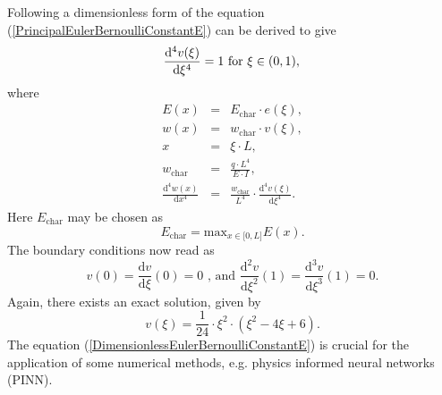 \documentclass[a4paper,11pt]{article}
\begin{document}
Following \cite[pp. 3]{hoffmann2014modellierung} a dimensionless form of the equation (\ref{PrincipalEulerBernoulliConstantE}) can be derived to give
\begin{equation} \label{DimensionlessEulerBernoulliConstantE}
\frac{\mathrm{d}^4 v(\xi)}{\mathrm{d}\xi^4} = 1 \text{ for } \xi \in (0,1),\\
\end{equation}
where
\begin{eqnarray*}
E (x) &=& E_{\mathrm{char}} \cdot e(\xi ) , \\
w(x) &=& w_{\mathrm{char}} \cdot v(\xi ) , \\
x &=& \xi\cdot L, \\
w_{\mathrm{char}} & = & \frac{q\cdot L^4}{E\cdot I }, \\
\frac{\mathrm{d}^4 w(x)}{\mathrm{d}x^4} & = & \frac{w_{\mathrm{char}}}{L^4}\cdot \frac{\mathrm{d}^4 v(\xi)}{\mathrm{d}\xi^4}.
\end{eqnarray*}
Here $E_{\mathrm{char}} $ may be chosen as 
\begin{equation*}
E_{\mathrm{char}} = \mathrm{max}_{x\in \lbrack 0,L \rbrack } E(x) .
\end{equation*}
The boundary conditions now read as
\begin{equation} \label{DimensionlessBoundaryConditions}
v( 0) = \frac{\mathrm{d} v}{\mathrm{d}\xi }(0) = 0 \text{ , and } \frac{\mathrm{d}^2 v}{\mathrm{d}\xi^2}(1) = \frac{\mathrm{d}^3 v}{\mathrm{d}\xi^3}(1) = 0.
\end{equation}
Again, there exists an exact solution, given by
\begin{equation*} 
v(\xi ) = \frac{1}{24} \cdot \xi^2 \cdot \left( \xi^2 -4 \xi + 6 \right) .
\end{equation*}
The equation (\ref{DimensionlessEulerBernoulliConstantE}) is crucial for the application of some numerical methods, e.g. physics informed neural networks (PINN).
\end{document}
